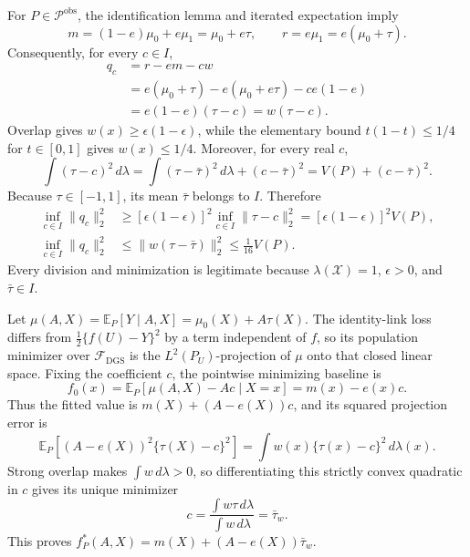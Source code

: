For \(P\in\mathcal P^{\mathrm{obs}}\), the identification lemma and iterated expectation imply
\[
 m=(1-e)\mu_0+e\mu_1=\mu_0+e\tau,
 \qquad
 r=e\mu_1=e(\mu_0+\tau).
\]
Consequently, for every \(c\in I\),
\[
\begin{aligned}
 q_c
 &=r-em-cw\\
 &=e(\mu_0+\tau)-e(\mu_0+e\tau)-ce(1-e)\\
 &=e(1-e)(\tau-c)=w(\tau-c).
\end{aligned}
\]
Overlap gives \(w(x)\ge\epsilon(1-\epsilon)\), while the elementary bound \(t(1-t)\le1/4\) for \(t\in[0,1]\) gives \(w(x)\le1/4\).  Moreover, for every real \(c\),
\[
 \int(\tau-c)^2\,d\lambda
 =\int(\tau-\bar\tau)^2\,d\lambda+(c-\bar\tau)^2
 =V(P)+(c-\bar\tau)^2.
\]
Because \(\tau\in[-1,1]\), its mean \(\bar\tau\) belongs to \(I\).  Therefore
\[
\begin{aligned}
 \inf_{c\in I}\|q_c\|_2^2
 &\ge [\epsilon(1-\epsilon)]^2
       \inf_{c\in I}\|\tau-c\|_2^2
 =[\epsilon(1-\epsilon)]^2V(P),\\
 \inf_{c\in I}\|q_c\|_2^2
 &\le \|w(\tau-\bar\tau)\|_2^2
 \le \frac1{16}V(P).
\end{aligned}
\]
Every division and minimization is legitimate because \(\lambda(\mathcal X)=1\), \(\epsilon>0\), and \(\bar\tau\in I\).

Let \(\mu(A,X)=\mathbb E_P[Y\mid A,X]=\mu_0(X)+A\tau(X)\).  The identity-link loss differs from \(\frac12\{f(U)-Y\}^2\) by a term independent of \(f\), so its population minimizer over \(\mathcal F_{\mathrm{DGS}}\) is the \(L^2(P_U)\)-projection of \(\mu\) onto that closed linear space.  Fixing the coefficient \(c\), the pointwise minimizing baseline is
\[
 f_0(x)=\mathbb E_P[\mu(A,X)-Ac\mid X=x]
       =m(x)-e(x)c.
\]
Thus the fitted value is \(m(X)+(A-e(X))c\), and its squared projection error is
\[
 \mathbb E_P[(A-e(X))^2\{\tau(X)-c\}^2]
 =\int w(x)\{\tau(x)-c\}^2\,d\lambda(x).
\]
Strong overlap makes \(\int w\,d\lambda>0\), so differentiating this strictly convex quadratic in \(c\) gives its unique minimizer
\[
 c=\frac{\int w\tau\,d\lambda}{\int w\,d\lambda}=\bar\tau_w.
\]
This proves \(f_P^*(A,X)=m(X)+(A-e(X))\bar\tau_w\).


